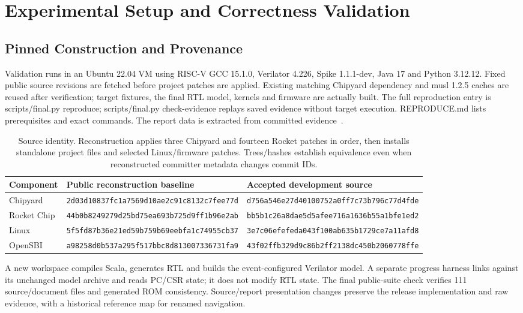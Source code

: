 \section{Experimental Setup and Correctness Validation}
\label{sec:evaluation}
\subsection{Pinned Construction and Provenance}
Validation runs in an Ubuntu 22.04 VM using RISC-V GCC 15.1.0, Verilator 4.226, Spike 1.1.1-dev, Java 17 and Python 3.12.12. Fixed public source revisions are fetched before project patches are applied. Existing matching Chipyard dependency and musl 1.2.5 caches are reused after verification; target fixtures, the final RTL model, kernels and firmware are actually built. The full reproduction entry is scripts/final.py reproduce; scripts/final.py check-evidence replays saved evidence without target execution. REPRODUCE.md lists prerequisites and exact commands. The report data is extracted from committed evidence~\citep{ssahpm}.

\begin{table}[t]
\centering\small
\begin{tabular}{lll}\toprule
Component & Public reconstruction baseline & Accepted development source\\\midrule
Chipyard &\scriptsize\texttt{2d03d10837fc1a7569d10ae2c91c8132c7fee77d}&\scriptsize\texttt{d756a546e27d40100752a0ff7c73b796c77d4fde}\\
Rocket Chip &\scriptsize\texttt{44b0b8249279d25bd75ea693b725d9ff1b96e2ab}&\scriptsize\texttt{bb5b1c26a8dae5d5afee716a1636b55a1bfe1ed2}\\
Linux &\scriptsize\texttt{5f5fd87b36e21ed59b759b69eebfa1c74955cb37}&\scriptsize\texttt{3e7c06efefeda043f100ab635b1729ce7a11afd8}\\
OpenSBI &\scriptsize\texttt{a98258d0b537a295f517bbc8d813007336731fa9}&\scriptsize\texttt{43f02ffb329d9c86b2ff2138dc450b2060778ffe}\\\bottomrule
\end{tabular}
\caption{Source identity. Reconstruction applies three Chipyard and fourteen Rocket patches in order, then installs standalone project files and selected Linux/firmware patches. Trees/hashes establish equivalence even when reconstructed committer metadata changes commit IDs.}
\label{tab:sources}
\end{table}

A new workspace compiles Scala, generates RTL and builds the event-configured Verilator model. A separate progress harness links against its unchanged model archive and reads PC/CSR state; it does not modify RTL state. The final public-suite check verifies 111 source/document files and generated ROM consistency. Source/report presentation changes preserve the release implementation and raw evidence, with a historical reference map for renamed navigation.

